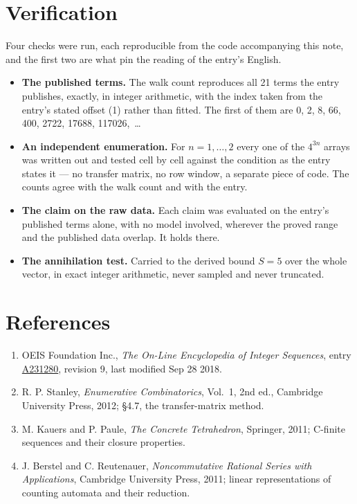 \documentclass[11pt]{article}
\theoremstyle{definition}
\begin{document}
\section{Verification}

Four checks were run, each reproducible from the code accompanying this note, and the first two are what pin the reading of the entry's English.

\begin{itemize}

\item {\bfseries The published terms.} The walk count reproduces all 21 terms the entry publishes, exactly, in integer arithmetic, with the index taken from the entry's stated offset (1) rather than fitted. The first of them are 0, 2, 8, 66, 400, 2722, 17688, 117026,~\dots

\item {\bfseries An independent enumeration.} For $n = 1,\dots,2$ every one of the $4^{3n}$ arrays was written out and tested cell by cell against the condition as the entry states it --- no transfer matrix, no row window, a separate piece of code. The counts agree with the walk count and with the entry.

\item {\bfseries The claim on the raw data.} Each claim was evaluated on the entry's published terms alone, with no model involved, wherever the proved range and the published data overlap. It holds there.

\item {\bfseries The annihilation test.} Carried to the derived bound $S = 5$ over the whole vector, in exact integer arithmetic, never sampled and never truncated.

\end{itemize}

\section{References}

\begin{enumerate}

\item OEIS Foundation Inc., \emph{The On-Line Encyclopedia of Integer Sequences}, entry \href{https://oeis.org/A231280}{A231280}, revision 9, last modified Sep 28 2018.

\item R. P. Stanley, \emph{Enumerative Combinatorics}, Vol.~1, 2nd ed., Cambridge University Press, 2012; \S4.7, the transfer-matrix method.

\item M. Kauers and P. Paule, \emph{The Concrete Tetrahedron}, Springer, 2011; C-finite sequences and their closure properties.

\item J. Berstel and C. Reutenauer, \emph{Noncommutative Rational Series with Applications}, Cambridge University Press, 2011; linear representations of counting automata and their reduction.

\end{enumerate}
\end{document}
